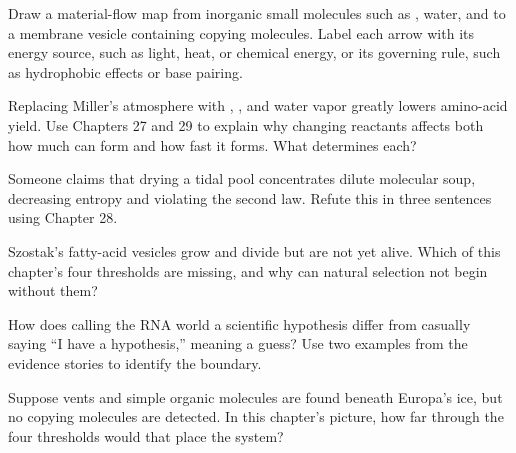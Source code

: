 \begin{sikaoti}
\item Draw a material-flow map from inorganic small molecules such as , water, and  to a membrane vesicle containing copying molecules. Label each arrow with its energy source, such as light, heat, or chemical energy, or its governing rule, such as hydrophobic effects or base pairing.
\item Replacing Miller's atmosphere with , , and water vapor greatly lowers amino-acid yield. Use Chapters 27 and 29 to explain why changing reactants affects both how much can form and how fast it forms. What determines each?
\item Someone claims that drying a tidal pool concentrates dilute molecular soup, decreasing entropy and violating the second law. Refute this in three sentences using Chapter 28.
\item Szostak's fatty-acid vesicles grow and divide but are not yet alive. Which of this chapter's four thresholds are missing, and why can natural selection not begin without them?
\item How does calling the RNA world a scientific hypothesis differ from casually saying ``I have a hypothesis,'' meaning a guess? Use two examples from the evidence stories to identify the boundary.
\item Suppose vents and simple organic molecules are found beneath Europa's ice, but no copying molecules are detected. In this chapter's picture, how far through the four thresholds would that place the system?
\end{sikaoti}
